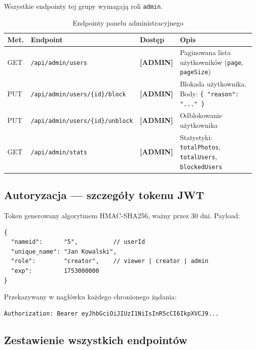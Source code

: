 \documentclass[12pt, a4paper]{article}
\begin{document}
Wszystkie endpointy tej grupy wymagają roli \texttt{admin}.

\begin{table}[H]
  \centering
  \caption{Endpointy panelu administracyjnego}
  \begin{tabular}{@{}L{1.5cm}L{5.5cm}L{2cm}L{5cm}@{}}
    \toprule
    \textbf{Met.} & \textbf{Endpoint} & \textbf{Dostęp} & \textbf{Opis} \\
    \midrule
    GET & \texttt{/api/admin/users}                   & \textbf{[ADMIN]} & Paginowana lista użytkowników (\texttt{page}, \texttt{pageSize}) \\
    PUT & \texttt{/api/admin/users/\{id\}/block}      & \textbf{[ADMIN]} & Blokada użytkownika. Body: \texttt{\{ "reason": "..." \}} \\
    PUT & \texttt{/api/admin/users/\{id\}/unblock}    & \textbf{[ADMIN]} & Odblokowanie użytkownika \\
    GET & \texttt{/api/admin/stats}                   & \textbf{[ADMIN]} & Statystyki: \texttt{totalPhotos}, \texttt{totalUsers}, \texttt{blockedUsers} \\
    \bottomrule
  \end{tabular}
\end{table}

\subsection{Autoryzacja — szczegóły tokenu JWT}

Token generowany algorytmem HMAC-SHA256, ważny przez 30 dni. Payload:

\begin{lstlisting}[style=plain, caption={Payload tokenu JWT}]
{
  "nameid":      "5",          // userId
  "unique_name": "Jan Kowalski",
  "role":        "creator",    // viewer | creator | admin
  "exp":         1753000000
}
\end{lstlisting}

Przekazywany w nagłówku każdego chronionego żądania:
\begin{lstlisting}[style=plain]
Authorization: Bearer eyJhbGciOiJIUzI1NiIsInR5cCI6IkpXVCJ9...
\end{lstlisting}

\subsection{Zestawienie wszystkich endpointów}
\end{document}

